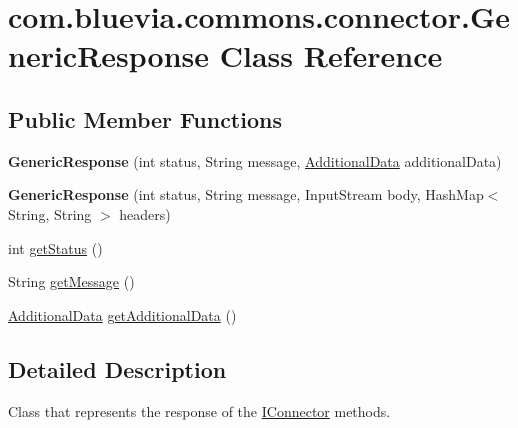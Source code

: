 \hypertarget{classcom_1_1bluevia_1_1commons_1_1connector_1_1GenericResponse}{
\section{com.bluevia.commons.connector.GenericResponse Class Reference}
\label{classcom_1_1bluevia_1_1commons_1_1connector_1_1GenericResponse}
}
\subsection*{Public Member Functions}
\begin{DoxyCompactItemize}
\item 
\hypertarget{classcom_1_1bluevia_1_1commons_1_1connector_1_1GenericResponse_a5959066b8ad2d6e08bff9e3e7fac64e2}{
{\bfseries GenericResponse} (int status, String message, \hyperlink{classcom_1_1bluevia_1_1commons_1_1connector_1_1http_1_1AdditionalData}{AdditionalData} additionalData)}
\label{classcom_1_1bluevia_1_1commons_1_1connector_1_1GenericResponse_a5959066b8ad2d6e08bff9e3e7fac64e2}

\item 
\hypertarget{classcom_1_1bluevia_1_1commons_1_1connector_1_1GenericResponse_af2114efd8e9a45678d825b3913f600f1}{
{\bfseries GenericResponse} (int status, String message, InputStream body, HashMap$<$ String, String $>$ headers)}
\label{classcom_1_1bluevia_1_1commons_1_1connector_1_1GenericResponse_af2114efd8e9a45678d825b3913f600f1}

\item 
int \hyperlink{classcom_1_1bluevia_1_1commons_1_1connector_1_1GenericResponse_a76363c826267f44492d6da6ccb9d5874}{getStatus} ()
\item 
String \hyperlink{classcom_1_1bluevia_1_1commons_1_1connector_1_1GenericResponse_af66c2a62192001c109ef5341fc87b6c7}{getMessage} ()
\item 
\hyperlink{classcom_1_1bluevia_1_1commons_1_1connector_1_1http_1_1AdditionalData}{AdditionalData} \hyperlink{classcom_1_1bluevia_1_1commons_1_1connector_1_1GenericResponse_a6fb8f267b52e526fe8a7a92adf13d7d9}{getAdditionalData} ()
\end{DoxyCompactItemize}


\subsection{Detailed Description}
Class that represents the response of the \hyperlink{interfacecom_1_1bluevia_1_1commons_1_1connector_1_1IConnector}{IConnector} methods.


